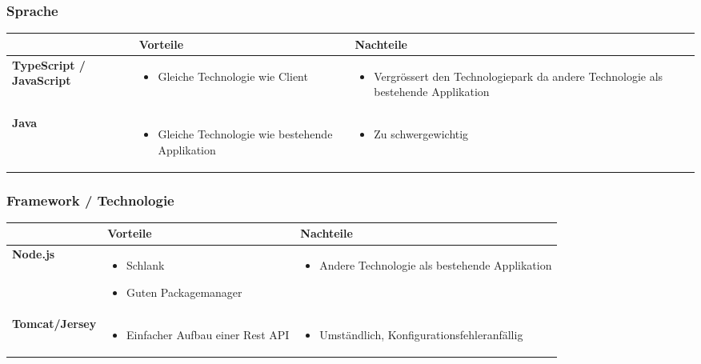 		\subsubsection{Sprache}
			\begin{tabularx}{\textwidth}{|lXX|}
				\hline
					\textbf{} & \textbf{Vorteile} & \textbf{Nachteile}\\
				\hline
					\textbf{TypeScript / JavaScript} &
					\begin{itemize}
						\item Gleiche Technologie wie Client
					\end{itemize} &
					\begin{itemize}
						\item Vergrössert den Technologiepark da andere Technologie als bestehende Applikation
					\end{itemize} \\
				\hline
				\textbf{Java} &
					\begin{itemize}
						\item Gleiche Technologie wie bestehende Applikation
					\end{itemize} &
					\begin{itemize}
						\item Zu schwergewichtig
					\end{itemize} \\
				\hline
			\end{tabularx}
				

				
		\subsubsection{Framework / Technologie}		
		
			\begin{tabularx}{\textwidth}{|lXX|}
				\hline
					\textbf{} & \textbf{Vorteile} & \textbf{Nachteile}\\
				\hline
					\textbf{Node.js} &
					\begin{itemize}
						\item Schlank
						\item Guten Packagemanager
					\end{itemize} &
					\begin{itemize}
						\item Andere Technologie als bestehende Applikation
					\end{itemize} \\
				\hline
					\textbf{Tomcat/Jersey} &
					\begin{itemize}
						\item Einfacher Aufbau einer Rest API
					\end{itemize} &
					\begin{itemize}
						\item Umständlich, Konfigurationsfehleranfällig
					\end{itemize} \\
				\hline
			\end{tabularx}




